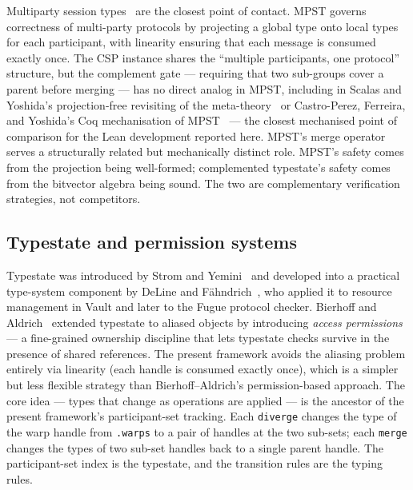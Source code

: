 \documentclass[acmsmall,screen,review,anonymous,nonacm]{acmart}
\begin{document}
Multiparty session types~\cite{honda:popl:2008,honda:jacm:2016} are the closest point of contact. MPST governs correctness of multi-party protocols by projecting a global type onto local types for each participant, with linearity ensuring that each message is consumed exactly once. The CSP instance shares the ``multiple participants, one protocol'' structure, but the complement gate --- requiring that two sub-groups cover a parent before merging --- has no direct analog in MPST, including in Scalas and Yoshida's projection-free revisiting of the meta-theory~\cite{scalas:popl:2019} or Castro-Perez, Ferreira, and Yoshida's Coq mechanisation of MPST~\cite{castro-perez:tacas:2020} --- the closest mechanised point of comparison for the Lean development reported here. MPST's merge operator serves a structurally related but mechanically distinct role. MPST's safety comes from the projection being well-formed; complemented typestate's safety comes from the bitvector algebra being sound. The two are complementary verification strategies, not competitors.

\subsection{Typestate and permission systems}\label{sec:typestate}

Typestate was introduced by Strom and Yemini~\cite{strom:tse:1986} and developed into a practical type-system component by DeLine and F\"ahndrich~\cite{deline:ecoop:2004}, who applied it to resource management in Vault and later to the Fugue protocol checker. Bierhoff and Aldrich~\cite{bierhoff:oopsla:2007} extended typestate to aliased objects by introducing \emph{access permissions} --- a fine-grained ownership discipline that lets typestate checks survive in the presence of shared references. The present framework avoids the aliasing problem entirely via linearity (each handle is consumed exactly once), which is a simpler but less flexible strategy than Bierhoff--Aldrich's permission-based approach. The core idea --- types that change as operations are applied --- is the ancestor of the present framework's participant-set tracking. Each \texttt{diverge} changes the type of the warp handle from \texttt{.warp\;s} to a pair of handles at the two sub-sets; each \texttt{merge} changes the types of two sub-set handles back to a single parent handle. The participant-set index is the typestate, and the transition rules are the typing rules.
\end{document}
